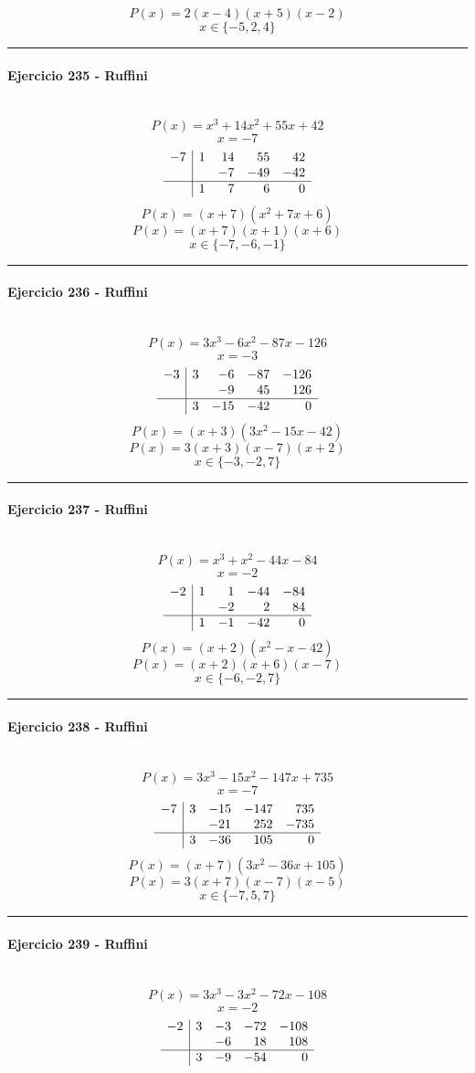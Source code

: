 \documentclass[10pt,a4paper]{article}
\newcommand{\res}[1]{\paragraph{#1}\mbox{}\\[-1.2em]}
\begin{document}
\[ P(x)=2(x-4)(x+5)(x-2) \]
\[ \boxed{x\in\{-5,2,4\}} \]
\vspace{1mm}\hrule\vspace{2mm}
\res{Ejercicio 235 - Ruffini}
\[ P(x)=x^{3} + 14 x^{2} + 55 x + 42 \]
\[ x=-7 \]
\[\begin{array}{r|rrrr}-7 & 1 & 14 & 55 & 42\\  &  & -7 & -49 & -42\\\hline  & 1 & 7 & 6 & 0\end{array}\]
\[ P(x)=(x+7)(x^{2} + 7 x + 6) \]
\[ P(x)=(x+7)(x+1)(x+6) \]
\[ \boxed{x\in\{-7,-6,-1\}} \]
\vspace{1mm}\hrule\vspace{2mm}
\res{Ejercicio 236 - Ruffini}
\[ P(x)=3 x^{3} - 6 x^{2} - 87 x - 126 \]
\[ x=-3 \]
\[\begin{array}{r|rrrr}-3 & 3 & -6 & -87 & -126\\  &  & -9 & 45 & 126\\\hline  & 3 & -15 & -42 & 0\end{array}\]
\[ P(x)=(x+3)(3 x^{2} - 15 x - 42) \]
\[ P(x)=3(x+3)(x-7)(x+2) \]
\[ \boxed{x\in\{-3,-2,7\}} \]
\vspace{1mm}\hrule\vspace{2mm}
\res{Ejercicio 237 - Ruffini}
\[ P(x)=x^{3} + x^{2} - 44 x - 84 \]
\[ x=-2 \]
\[\begin{array}{r|rrrr}-2 & 1 & 1 & -44 & -84\\  &  & -2 & 2 & 84\\\hline  & 1 & -1 & -42 & 0\end{array}\]
\[ P(x)=(x+2)(x^{2} - x - 42) \]
\[ P(x)=(x+2)(x+6)(x-7) \]
\[ \boxed{x\in\{-6,-2,7\}} \]
\vspace{1mm}\hrule\vspace{2mm}
\res{Ejercicio 238 - Ruffini}
\[ P(x)=3 x^{3} - 15 x^{2} - 147 x + 735 \]
\[ x=-7 \]
\[\begin{array}{r|rrrr}-7 & 3 & -15 & -147 & 735\\  &  & -21 & 252 & -735\\\hline  & 3 & -36 & 105 & 0\end{array}\]
\[ P(x)=(x+7)(3 x^{2} - 36 x + 105) \]
\[ P(x)=3(x+7)(x-7)(x-5) \]
\[ \boxed{x\in\{-7,5,7\}} \]
\vspace{1mm}\hrule\vspace{2mm}
\res{Ejercicio 239 - Ruffini}
\[ P(x)=3 x^{3} - 3 x^{2} - 72 x - 108 \]
\[ x=-2 \]
\[\begin{array}{r|rrrr}-2 & 3 & -3 & -72 & -108\\  &  & -6 & 18 & 108\\\hline  & 3 & -9 & -54 & 0\end{array}\]
\end{document}
